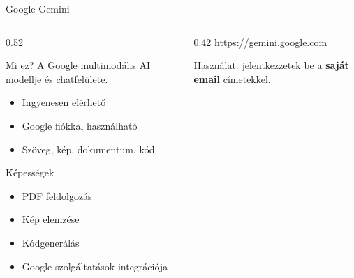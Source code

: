 \documentclass[aspectratio=169, 12pt]{beamer}
\begin{document}
\begin{frame}{Google Gemini}
  \footnotesize
  \begin{columns}[T,onlytextwidth]
    \begin{column}{0.52\textwidth}
      \begin{block}{Mi ez?}
        A Google multimodális AI modellje és chatfelülete.
        \begin{itemize}\setlength{\itemsep}{1pt}
          \item Ingyenesen elérhető
          \item Google fiókkal használható
          \item Szöveg, kép, dokumentum, kód
        \end{itemize}
      \end{block}

      \vspace{0.15cm}

      \begin{exampleblock}{Képességek}
        \begin{itemize}\setlength{\itemsep}{1pt}
          \item PDF feldolgozás
          \item Kép elemzése
          \item Kódgenerálás
          \item Google szolgáltatások integrációja
        \end{itemize}
      \end{exampleblock}
    \end{column}
    \begin{column}{0.42\textwidth}
      \vspace{1cm}
      \centering
      \url{https://gemini.google.com}

      \vspace{0.5cm}

      Használat: jelentkezzetek be a \textbf{saját email} címetekkel.
    \end{column}
  \end{columns}
\end{frame}
\end{document}
